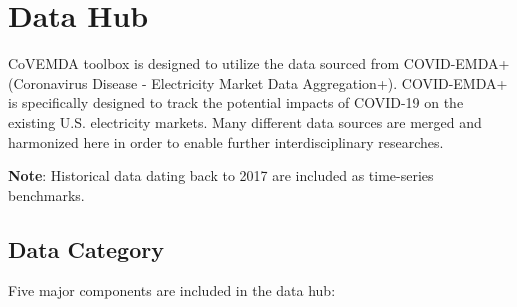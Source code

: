 \documentclass[10pt]{article}
\newcommand{\covemda}{CoVEMDA}
\numberwithin{equation}{section}
\numberwithin{table}{section}
\numberwithin{figure}{section}
\begin{document}
\clearpage
\section{Data Hub} \label{sec:datahub}
\covemda{} toolbox is designed to utilize the data sourced from COVID-EMDA+ (Coronavirus Disease - Electricity Market Data Aggregation+). COVID-EMDA+ is specifically designed to track the potential impacts of COVID-19 on the existing U.S. electricity markets. Many different data sources are merged and harmonized here in order to enable further interdisciplinary researches. 

\textbf{Note}: Historical data dating back to 2017 are included as time-series benchmarks.

\subsection{Data Category}
Five major components are included in the data hub: 
\end{document}

